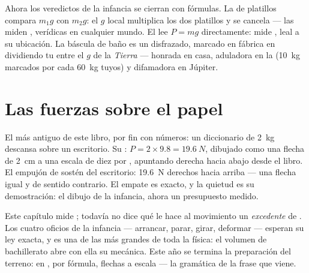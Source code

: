 \begin{remark}\label{rem:g9:weight-vs-mass:scales}
Ahora los veredictos de la infancia se cierran con fórmulas. La 
de platillos compara $m_1 g$ con $m_2 g$: el $g$ local multiplica los
dos platillos y se cancela --- las  miden
\emph{}, verídicas en cualquier mundo. El
 lee $P = m g$ directamente: mide
\emph{}, leal a su ubicación. La báscula de baño es un
 disfrazado, marcado en fábrica en
 dividiendo tu  entre el $g$ de la
\emph{Tierra} --- honrada en casa, aduladora en la 
(\qty{10}{kg} marcados por cada \qty{60}{kg} tuyos) y difamadora en
Júpiter.
\end{remark}

\section{Las fuerzas sobre el papel}

\begin{example}\label{ex:g9:weight-vs-mass:book}
El  más antiguo de este libro, por fin con números: un
diccionario de \qty{2}{kg} descansa sobre un escritorio. Su
: $P = 2 \times 9.8 = \qty{19.6}{N}$, dibujado como una flecha
de \qty{2}{cm} a una escala de diez  por
, apuntando derecha hacia abajo desde el libro. El
empujón de sostén del escritorio: \qty{19.6}{N} derechos hacia arriba
--- una flecha igual y de sentido contrario. El empate es exacto, y la
quietud es su demostración: el dibujo de la infancia, ahora un
presupuesto medido.
\end{example}

\begin{remark}\label{rem:g9:weight-vs-mass:dynamics}
Este capítulo mide ; todavía no dice qué le
hace al movimiento un \emph{excedente} de . Los cuatro
oficios de la infancia --- arrancar, parar, girar, deformar --- esperan
su ley exacta, y es una de las más grandes de toda la física: el
volumen de bachillerato abre con ella su mecánica. Este año se termina
la preparación del terreno:  en ,
 por fórmula, flechas a escala --- la gramática de la frase
que viene.
\end{remark}

